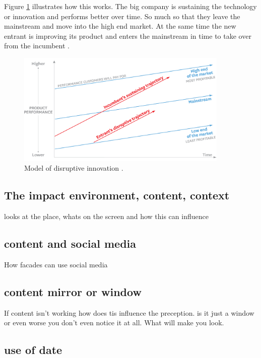 \documentclass[a4paper, 11pt]{article}
\begin{document}
Figure \ref{fig:graph1} illustrates how this works. The big company is sustaining the technology or innovation and performs better over time. So much so that they leave the mainstream and move into the high end market. At the same time the new entrant is improving its product and enters the mainstream in time to take over from the incumbent \citep{Christensen97}.

\begin{figure}[h!]
    \centering
    \includegraphics[width=0.9\textwidth]{big-model.png}
    \caption{Model of disruptive innovation \citep{Christensen2015}.}
    \label{fig:graph1}
\end{figure}


\subsection{The impact environment, content, context}

\cite{Daalsgaard2010} looks at the place, whats on the screen and how this can influence


\subsection{content and social media}

How facades can use social media

\subsection{content mirror or window}

If content isn't working how does tis influence the preception. is it just a window or even worse you don't even notice it at all. What will make you look.

\subsection{use of date}
\end{document}
